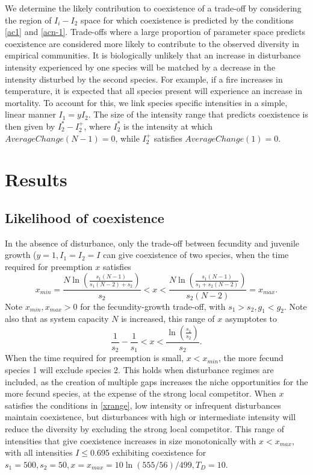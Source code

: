 \documentclass[a4paper]{article}
\begin{document}
We determine the  likely contribution to coexistence of a trade-off by considering the region of $I_i - I_2$ space for which coexistence is predicted by the conditions \eqref{ac1} and \eqref{acn-1}. Trade-offs where a large proportion of parameter space predicts coexistence are considered more likely to contribute to the observed diversity in empirical communities. It is biologically unlikely that an increase in disturbance intensity experienced by one species will be matched by a decrease in the intensity disturbed by the second species. For example, if a fire increases in temperature, it is expected that all species present will experience an increase in mortality. To account for this, we link species specific intensities in a simple, linear manner $I_1=yI_2$. The size of the intensity range that predicts coexistence is then given by $I_2^* - I_2^+$, where $I_2^*$ is the intensity at which $AverageChange(N-1)=0$, while $I_2^+$ satisfies $AverageChange(1)=0$.

\section{Results} \label{results}
\subsection{Likelihood of coexistence}
In the absence of disturbance, only the trade-off between fecundity and juvenile growth ($y=1, I_1=I_2=I$ can give coexistence of two species, when the time required for preemption $x$ satisfies
\begin{equation}
\label{xrange}
x_{min}=\frac{N\ln\left(\frac{s_1(N-1)}{s_1(N-2)+s_2}\right)}{s_2}<x<\frac{N\ln\left(\frac{s_1(N-1)}{s_1+s_2(N-2)}\right)}{s_2(N-2)}=x_{max}.
\end{equation}
Note $x_{min},x_{max}>0$ for the fecundity-growth trade-off, with $s_1>s_2, g_1<g_2$. Note also that as system capacity $N$ is increased, this range of $x$ asymptotes to
\begin{equation}
\label{bignxrange}
\frac{1}{s_2}-\frac{1}{s_1}<x<\frac{\ln\left(\frac{s_1}{s_2}\right)}{s_2}.
\end{equation} 
When the time required for preemption is small, $x<x_{min}$, the more fecund species 1 will exclude species 2. This holds when disturbance regimes are included, as the creation of multiple gaps increases the niche opportunities for the more fecund species, at the expense of the strong local competitor. When $x$ satisfies the conditions in \eqref{xrange}, low intensity or infrequent disturbances maintain coexistence, but disturbances with high or intermediate intensity will reduce the diversity by excluding the strong local competitor. This range of intensities that give coexistence increases in size monotonically with $x<x_{max}$, with all intensities $I \leq 0.695$ exhibiting coexistence for $s_1=500,s_2=50,x=x_{max}=10 \ln(555/56)/499,T_D=10$.
\end{document}
